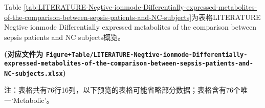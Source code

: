 \documentclass[
]{article}
\begin{document}
Table \ref{tab:LITERATURE-Negtive-ionmode-Differentially-expressed-metabolites-of-the-comparison-between-sepsis-patients-and-NC-subjects}为表格LITERATURE Negtive ionmode Differentially expressed metabolites of the comparison between sepsis patients and NC subjects概览。

\textbf{(对应文件为 \texttt{Figure+Table/LITERATURE-Negtive-ionmode-Differentially-expressed-metabolites-of-the-comparison-between-sepsis-patients-and-NC-subjects.xlsx})}

\begin{center}\begin{tcolorbox}[colback=gray!10, colframe=gray!50, width=0.9\linewidth, arc=1mm, boxrule=0.5pt]注：表格共有76行16列，以下预览的表格可能省略部分数据；表格含有76个唯一`Metabolic'。
\end{tcolorbox}
\end{center}
\end{document}
